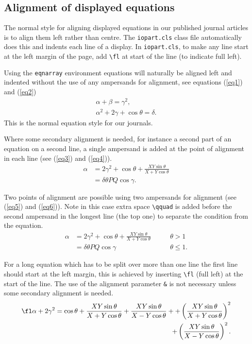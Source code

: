 \documentclass[12pt]{iopart}
\begin{document}
\subsection{Alignment of displayed equations}

The normal style for aligning displayed equations in our published journal articles is to align them left rather than centre. The \verb"iopart.cls" class file automatically does this and indents each line of a display.  In \verb"iopart.cls", to make any line start at the left margin of the page, add \verb"\fl" at start of the line (to indicate full left).

Using the \verb"eqnarray" environment equations will naturally be aligned left and indented without the use of any ampersands for alignment, see equations (\ref{eq1}) and (\ref{eq2})
\begin{eqnarray}
\alpha + \beta =\gamma^2, \label{eq1}\\
\alpha^2 + 2\gamma + \cos\theta = \delta. \label{eq2} 
\end{eqnarray}
This is the normal equation style for our journals.

Where some secondary alignment is needed, for instance a second part of an equation on a second line, a single ampersand is added at the point of alignment in each line  (see  (\ref{eq3}) and (\ref{eq4})).
\begin{eqnarray}
\alpha &=2\gamma^2 + \cos\theta + \frac{XY \sin\theta}{X+ Y\cos\theta} \label{eq3}\\
 & = \delta\theta PQ \cos\gamma. \label{eq4} 
\end{eqnarray}
 
Two points of alignment are possible using two ampersands for alignment (see  (\ref{eq5}) and (\ref{eq6})).  Note in this case extra space \verb"\qquad" is added before the second ampersand in the longest line (the top one) to separate the condition from the equation. 
\begin{eqnarray}
\alpha &=2\gamma^2 + \cos\theta + \frac{XY \sin\theta}{X+ Y\cos\theta}\qquad& \theta > 1 \label{eq5}\\
 & = \delta\theta PQ \cos\gamma &\theta \leq 1.\label{eq6} 
\end{eqnarray}

For a long equation which has to be split over more than one line the first line should start at the left margin, this is achieved by inserting \verb"\fl" (full left) at the start of the line. The use of the alignment parameter \verb"&" is not necessary unless some secondary alignment is needed.
\begin{eqnarray}
\fl \alpha + 2\gamma^2 = \cos\theta + \frac{XY \sin\theta}{X+ Y\cos\theta} +  \frac{XY \sin\theta}{X- Y\cos\theta} +
+ \left(\frac{XY \sin\theta}{X+ Y\cos\theta}\right)^2 \nonumber\\
+  \left(\frac{XY \sin\theta}{X- Y\cos\theta}\right)^2.\label{eq7} 
\end{eqnarray}
\end{document}
